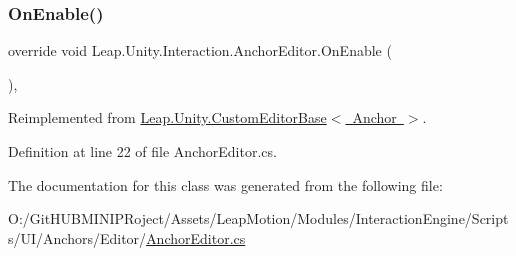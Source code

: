 \subsubsection{\texorpdfstring{OnEnable()}{OnEnable()}}
{\footnotesize\ttfamily override void Leap.\+Unity.\+Interaction.\+Anchor\+Editor.\+On\+Enable (\begin{DoxyParamCaption}{ }\end{DoxyParamCaption})\hspace{0.3cm}{\ttfamily [protected]}, {\ttfamily [virtual]}}



Reimplemented from \mbox{\hyperlink{class_leap_1_1_unity_1_1_custom_editor_base_a2268bc01655342bd3da5ae015bfa2f93}{Leap.\+Unity.\+Custom\+Editor\+Base$<$ Anchor $>$}}.



Definition at line 22 of file Anchor\+Editor.\+cs.



The documentation for this class was generated from the following file\+:\begin{DoxyCompactItemize}
\item 
O\+:/\+Git\+H\+U\+B\+M\+I\+N\+I\+P\+Roject/\+Assets/\+Leap\+Motion/\+Modules/\+Interaction\+Engine/\+Scripts/\+U\+I/\+Anchors/\+Editor/\mbox{\hyperlink{_anchor_editor_8cs}{Anchor\+Editor.\+cs}}\end{DoxyCompactItemize}
